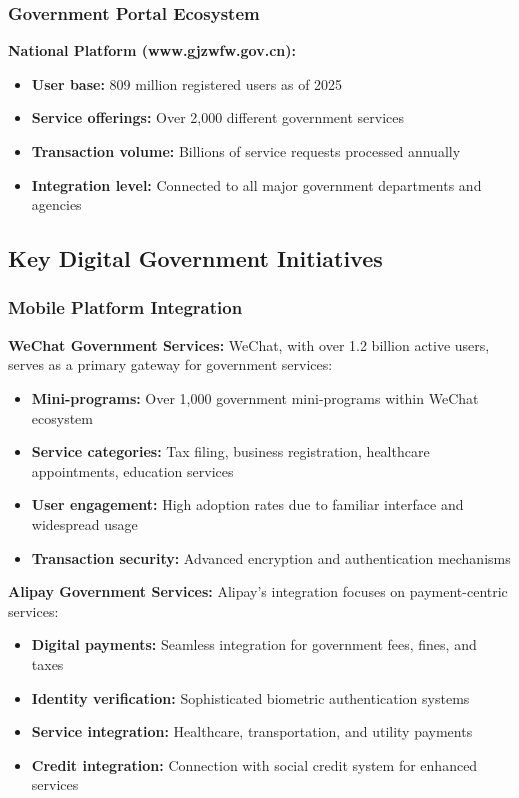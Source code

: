 \documentclass[12pt,a4paper]{article}
\begin{document}
\subsubsection{Government Portal Ecosystem}

\textbf{National Platform (www.gjzwfw.gov.cn):}
\begin{itemize}
    \item \textbf{User base:} 809 million registered users as of 2025
    \item \textbf{Service offerings:} Over 2,000 different government services
    \item \textbf{Transaction volume:} Billions of service requests processed annually
    \item \textbf{Integration level:} Connected to all major government departments and agencies
\end{itemize}

\subsection{Key Digital Government Initiatives}

\subsubsection{Mobile Platform Integration}

\textbf{WeChat Government Services:}
WeChat, with over 1.2 billion active users, serves as a primary gateway for government services:

\begin{itemize}
    \item \textbf{Mini-programs:} Over 1,000 government mini-programs within WeChat ecosystem
    \item \textbf{Service categories:} Tax filing, business registration, healthcare appointments, education services
    \item \textbf{User engagement:} High adoption rates due to familiar interface and widespread usage
    \item \textbf{Transaction security:} Advanced encryption and authentication mechanisms
\end{itemize}

\textbf{Alipay Government Services:}
Alipay's integration focuses on payment-centric services:

\begin{itemize}
    \item \textbf{Digital payments:} Seamless integration for government fees, fines, and taxes
    \item \textbf{Identity verification:} Sophisticated biometric authentication systems
    \item \textbf{Service integration:} Healthcare, transportation, and utility payments
    \item \textbf{Credit integration:} Connection with social credit system for enhanced services
\end{itemize}
\end{document}
